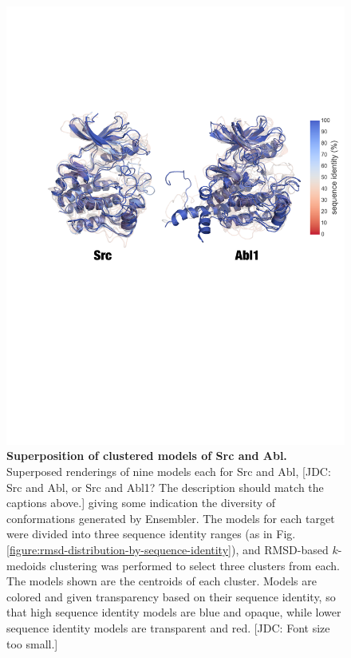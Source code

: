 \documentclass[aps,pre,twocolumn,nofootinbib,superscriptaddress,linenumbers]{revtex4-1}
\begin{document}
\begin{figure}[tb]
    \includegraphics[width=1.0\columnwidth]{superposition-src_abl/superposed-seqid_classes-clustered-one_fig}
    
    \caption{{\bf Superposition of clustered models of Src and Abl.}
    Superposed renderings of nine models each for Src and Abl, 
    {\color{red}[JDC: Src and Abl, or Src and Abl1? The description should match the captions above.]}
    giving some indication the diversity of conformations generated by Ensembler.
    The models for each target were divided into three sequence identity ranges (as in Fig. \ref{figure:rmsd-distribution-by-sequence-identity}), and RMSD-based $k$-medoids clustering was performed to select three clusters from each.
    The models shown are the centroids of each cluster.
    Models are colored and given transparency based on their sequence identity, so that high sequence identity models are blue and opaque, while lower sequence identity models are transparent and red.
    {\color{red}[JDC: Font size too small.]}
  }
  \label{figure:superposition}
\end{figure}
\end{document}
